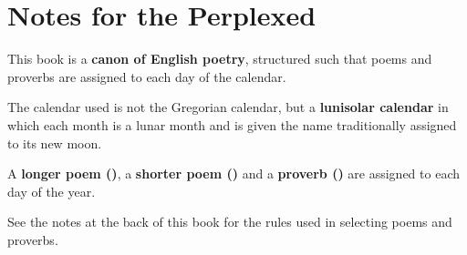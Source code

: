 \chapter*{Notes for the Perplexed}

This book is a \textbf{canon of English poetry}, structured such that poems and proverbs are assigned to each day of the calendar.

The calendar used is not the Gregorian calendar, but a \textbf{lunisolar calendar} in which each month is a lunar month and is given the name traditionally assigned to its new moon.

A \textbf{longer poem (\textsongsymbol)}, a \textbf{shorter poem (\textsonnetsymbol)} and a \textbf{proverb (\textproverbsymbol)} are assigned to each day of the year.

See the notes at the back of this book for the rules used in selecting poems and proverbs.

